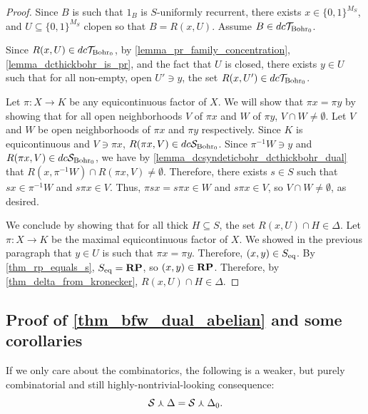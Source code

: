 \begin{proof}
    Since $B$ is such that $1_B$ is $S$-uniformly recurrent, there exists $x \in \{0,1\}^{M_S}$, and $U \subseteq \{0,1\}^{M_S}$ clopen so that $B = R(x,U)$.  Assume $B \in dc\mathcal{T}_{\text{Bohr}_0}$.

    Since $R(x,U) \in dc\mathcal{T}_{\text{Bohr}_0}$, by \cref{lemma_pr_family_concentration}, \cref{lemma_dcthickbohr_is_pr}, and the fact that $U$ is closed, there exists $y \in U$ such that for all non-empty, open $U' \ni y$, the set $R(x,U') \in dc\mathcal{T}_{\text{Bohr}_0}$.
    
    Let $\pi: X \to K$ be any equicontinuous factor of $X$.  We will show that $\pi x = \pi y$ by showing that for all open neighborhoods $V$ of $\pi x$ and $W$ of $\pi y$, $V \cap W \neq \emptyset$.  Let $V$ and $W$ be open neighborhoods of $\pi x$ and $\pi y$ respectively.  Since $K$ is equicontinuous and $V \ni \pi x$, $R(\pi x, V) \in dc\mathcal{S}_{\text{Bohr}_0}$. Since $\pi^{-1} W \ni y$ and $R(\pi x, V) \in dc\mathcal{S}_{\text{Bohr}_0}$, we have by \cref{lemma_dcsyndeticbohr_dcthickbohr_dual} that $R(x,\pi^{-1} W) \cap R(\pi x, V) \neq \emptyset$.  Therefore, there exists $s \in S$ such that $sx \in \pi^{-1} W$ and $s \pi x \in V$.  Thus, $\pi s x = s \pi x \in W$ and $s \pi x \in V$, so $V \cap W \neq \emptyset$, as desired.

    We conclude by showing that for all thick $H \subseteq S$, the set $R(x,U) \cap H \in \Delta$. Let $\pi: X \to K$ be the maximal equicontinuous factor of $X$.  We showed in the previous paragraph that $y \in U$ is such that $\pi x = \pi y$.  Therefore, $(x,y) \in S_\text{eq}$.  By \cref{thm_rp_equals_s}, $S_\text{eq} = \mathbf{RP}$, so $(x,y) \in \mathbf{RP}$.  Therefore, by \cref{thm_delta_from_kronecker}, $R(x,U) \cap H \in \Delta$.
\end{proof}


\subsection{Proof of \cref{thm_bfw_dual_abelian} and some corollaries}

If we only care about the combinatorics, the following is a weaker, but purely combinatorial and still highly-nontrivial-looking consequence:
\[\mathcal{S} \curlywedge \Delta = \mathcal{S} \curlywedge \Delta_0.\]

